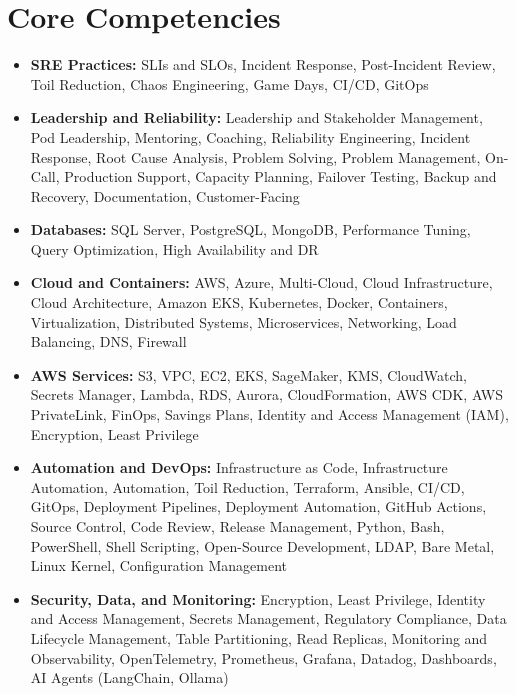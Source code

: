 \documentclass[10pt,a4paper]{article}
\begin{document}
\section{Core Competencies}
\begin{itemize}
  \item \textbf{SRE Practices:} SLIs and SLOs, Incident Response, Post-Incident Review, Toil Reduction, Chaos Engineering, Game Days, CI/CD, GitOps
  \item \textbf{Leadership and Reliability:} Leadership and Stakeholder Management, Pod Leadership, Mentoring, Coaching, Reliability Engineering, Incident Response, Root Cause Analysis, Problem Solving, Problem Management, On-Call, Production Support, Capacity Planning, Failover Testing, Backup and Recovery, Documentation, Customer-Facing
  \item \textbf{Databases:} SQL Server, PostgreSQL, MongoDB, Performance Tuning, Query Optimization, High Availability and DR
  \item \textbf{Cloud and Containers:} AWS, Azure, Multi-Cloud, Cloud Infrastructure, Cloud Architecture, Amazon EKS, Kubernetes, Docker, Containers, Virtualization, Distributed Systems, Microservices, Networking, Load Balancing, DNS, Firewall
  \item \textbf{AWS Services:} S3, VPC, EC2, EKS, SageMaker, KMS, CloudWatch, Secrets Manager, Lambda, RDS, Aurora, CloudFormation, AWS CDK, AWS PrivateLink, FinOps, Savings Plans, Identity and Access Management (IAM), Encryption, Least Privilege
  \item \textbf{Automation and DevOps:} Infrastructure as Code, Infrastructure Automation, Automation, Toil Reduction, Terraform, Ansible, CI/CD, GitOps, Deployment Pipelines, Deployment Automation, GitHub Actions, Source Control, Code Review, Release Management, Python, Bash, PowerShell, Shell Scripting, Open-Source Development, LDAP, Bare Metal, Linux Kernel, Configuration Management
  \item \textbf{Security, Data, and Monitoring:} Encryption, Least Privilege, Identity and Access Management, Secrets Management, Regulatory Compliance, Data Lifecycle Management, Table Partitioning, Read Replicas, Monitoring and Observability, OpenTelemetry, Prometheus, Grafana, Datadog, Dashboards, AI Agents (LangChain, Ollama)
\end{itemize}
\end{document}
